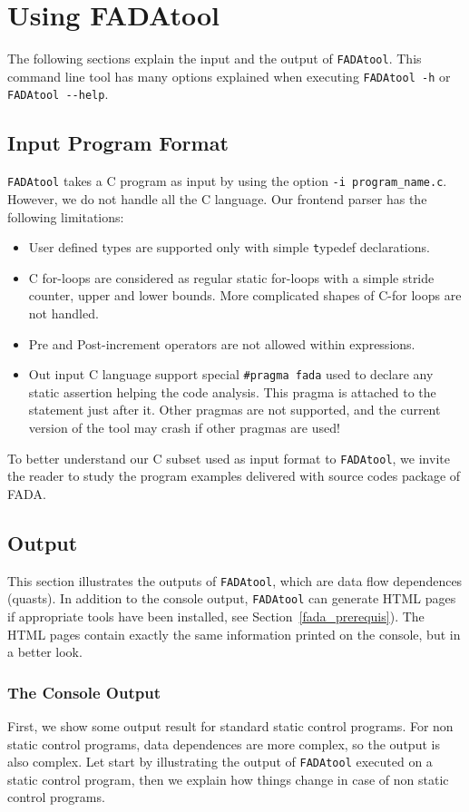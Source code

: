 \section{Using FADAtool}
The following sections explain the input and the output of \verb|FADAtool|. This command line tool has many options explained when executing \verb|FADAtool -h| or \verb|FADAtool --help|. 
\subsection{Input Program Format}
\verb|FADAtool| takes a C program as input by using the option \verb|-i program_name.c|. However, we do not handle all the C language. Our frontend parser has the following limitations:
\begin{itemize}
 \item User defined types are supported only with simple {\texttt typedef} declarations.
 \item C for-loops are considered as regular static for-loops with a simple stride counter, upper and lower bounds. More complicated shapes of C-for loops are not handled.
 \item Pre and Post-increment operators are not allowed within expressions.
 \item Out input C language support special \verb|#pragma fada| used to declare any static assertion helping the code analysis. This pragma is attached to the statement just after it. Other pragmas are not supported, and the current version of the tool may crash if other pragmas are used!
\end{itemize}
To better understand our C subset used as input format to \verb|FADAtool|, we invite the reader to study the program examples delivered with source codes package of FADA. 
\subsection{Output}
This section illustrates the outputs of \verb|FADAtool|, which are data flow dependences (quasts). In addition to the console output, \verb|FADAtool| can generate HTML pages if appropriate tools have been installed, see Section~\ref{fada_prerequis}). The HTML pages contain exactly the same information printed on the console, but in a better look.

\subsubsection{The Console Output}
First, we show some output result for standard static control programs. For non static control programs, data dependences are more complex, so the output is also complex. Let start by illustrating the output of \verb|FADAtool| executed on a static control program, then we explain how things change in case of non static control programs.

